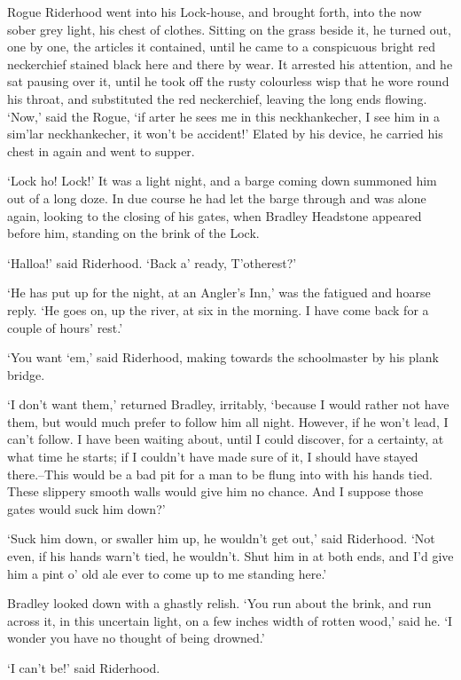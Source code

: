 Rogue Riderhood went into his Lock-house, and brought forth, into the
now sober grey light, his chest of clothes. Sitting on the grass beside
it, he turned out, one by one, the articles it contained, until he came
to a conspicuous bright red neckerchief stained black here and there by
wear. It arrested his attention, and he sat pausing over it, until he
took off the rusty colourless wisp that he wore round his throat, and
substituted the red neckerchief, leaving the long ends flowing. ‘Now,’
said the Rogue, ‘if arter he sees me in this neckhankecher, I see him in
a sim’lar neckhankecher, it won’t be accident!’ Elated by his device, he
carried his chest in again and went to supper.

‘Lock ho! Lock!’ It was a light night, and a barge coming down summoned
him out of a long doze. In due course he had let the barge through
and was alone again, looking to the closing of his gates, when Bradley
Headstone appeared before him, standing on the brink of the Lock.

‘Halloa!’ said Riderhood. ‘Back a’ ready, T’otherest?’

‘He has put up for the night, at an Angler’s Inn,’ was the fatigued and
hoarse reply. ‘He goes on, up the river, at six in the morning. I have
come back for a couple of hours’ rest.’

‘You want ‘em,’ said Riderhood, making towards the schoolmaster by his
plank bridge.

‘I don’t want them,’ returned Bradley, irritably, ‘because I would
rather not have them, but would much prefer to follow him all night.
However, if he won’t lead, I can’t follow. I have been waiting about,
until I could discover, for a certainty, at what time he starts; if I
couldn’t have made sure of it, I should have stayed there.--This would
be a bad pit for a man to be flung into with his hands tied. These
slippery smooth walls would give him no chance. And I suppose those
gates would suck him down?’

‘Suck him down, or swaller him up, he wouldn’t get out,’ said Riderhood.
‘Not even, if his hands warn’t tied, he wouldn’t. Shut him in at both
ends, and I’d give him a pint o’ old ale ever to come up to me standing
here.’

Bradley looked down with a ghastly relish. ‘You run about the brink, and
run across it, in this uncertain light, on a few inches width of rotten
wood,’ said he. ‘I wonder you have no thought of being drowned.’

‘I can’t be!’ said Riderhood.


